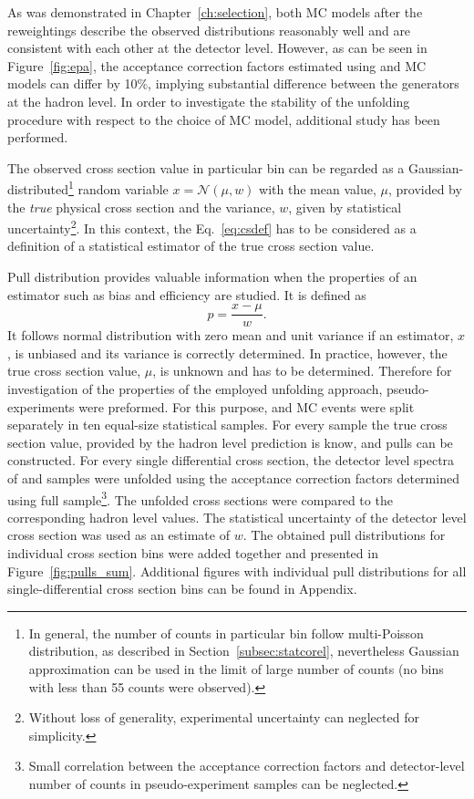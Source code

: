 As was demonstrated in Chapter~\ref{ch:selection}, both MC models after the reweightings describe the observed distributions reasonably well and are consistent with each other at the detector level. However, as can be seen in Figure~\ref{fig:epa}, the acceptance correction factors estimated using \ariadne and \lepto MC models can differ by 10\%, implying substantial difference between the generators at the hadron level. In order to investigate the stability of the unfolding procedure with respect to the choice of MC model, additional study has been performed.

The observed cross section value in particular bin can be regarded as a Gaussian-distributed\footnote{In general, the number of counts in particular bin follow multi-Poisson distribution, as described in Section~\ref{subsec:statcorel}, nevertheless Gaussian approximation can be used in the limit of large number of counts (no bins with less than 55 counts were observed).} random variable $x = \mathcal{N}\left(\mu,w\right)$ with the mean value, $\mu$, provided by the \textit{true} physical cross section and the variance, $w$, given by statistical uncertainty\footnote{Without loss of generality, experimental uncertainty can neglected for simplicity.}. In this context, the Eq.~\eqref{eq:csdef} has to be considered as a definition of a statistical estimator of the true cross section value.

Pull distribution provides valuable information when the properties of an estimator such as bias and efficiency are studied. It is defined as 
\begin{equation}
p=\frac{x-\mu}{w}.
\label{eq:pulldef}
\end{equation}
It follows normal distribution with zero mean and unit variance if an estimator, $x$, is unbiased and its variance is correctly determined. In practice, however, the true cross section value, $\mu$, is unknown and has to be determined. Therefore for investigation of the properties of the employed unfolding approach, pseudo-experiments were preformed. For this purpose, \lepto and \ariadne MC events were split separately in ten equal-size statistical samples. For every sample the true cross section value, provided by the hadron level prediction is know, and pulls can be constructed. For every single differential cross section, the detector level spectra of \lepto and \ariadne samples were unfolded using the acceptance correction factors determined using full \lepto sample\footnote{Small correlation between the acceptance correction factors and detector-level number of counts in \lepto pseudo-experiment samples can be neglected.}. The unfolded cross sections were compared to the corresponding hadron level values. The statistical uncertainty of the detector level cross section was used as an estimate of $w$. The obtained pull distributions for individual cross section bins were added together and presented in Figure~\ref{fig:pulls_sum}. Additional figures with individual pull distributions for all single-differential cross section bins can be found in Appendix.

